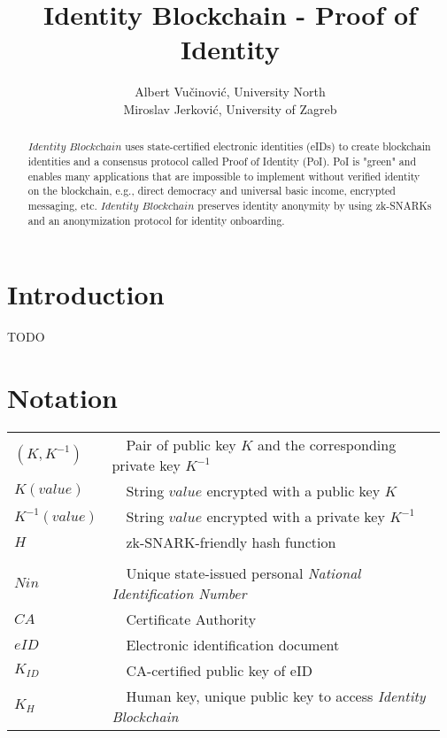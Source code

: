 \documentclass{article}
\title{Identity Blockchain - Proof of Identity}
\author{
Albert Vučinović, University North\\
Miroslav Jerković, University of Zagreb}
\newcommand{\khk}{K_{H}}
\newcommand{\kid}{K_{ID}}
\newcommand{\pbc}{\textit{Identity Blockchain}}
\begin{document}
\maketitle

\begin{abstract}
$\pbc$ uses state-certified electronic identities (eIDs) to create blockchain identities and a consensus protocol called Proof of Identity (PoI). PoI is "green" and enables many applications that are impossible to implement without verified identity on the blockchain, e.g., direct democracy and universal basic income, encrypted messaging, etc. $\pbc$ preserves identity anonymity by using zk-SNARKs and an anonymization protocol for identity onboarding.
\end{abstract}

\section{Introduction}
TODO

\section{Notation}
\vspace{10px}
\begin{tabular}{p{0.16\linewidth}| p{0.81\linewidth}}
  $(K, K^{-1})$ & \ \ Pair of public key $K$ and the corresponding private key $K^{-1}$ \\[3px]
	$K(value)$ & \ \ String $value$ encrypted with a public key $K$ \\[3px]
	$K^{-1}(value)$ & \ \ String $value$ encrypted with a private key $K^{-1}$ \\[3px]
  $H$ & \ \ zk-SNARK-friendly hash function \\[5px]
 \hline \\
   $Nin$ & \ \ Unique state-issued personal \textit{National Identification Number}\\[3px]
   $CA$ & \ \ Certificate Authority \\[3px]
   $eID$ & \ \ Electronic identification document \\[3px]
	$\kid$ & \ \ CA-certified public key of eID\\[3px]
  $\khk$ & \ \ Human key, unique public key to access \pbc{}

\end{tabular}

\vspace{15px}
\end{document}
